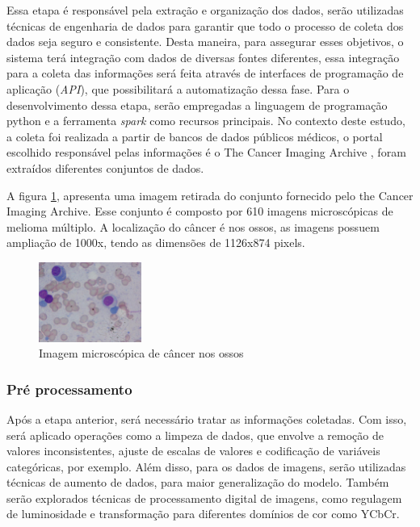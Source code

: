 Essa etapa é responsável pela extração e organização dos dados, serão utilizadas técnicas de engenharia de dados para garantir que todo o processo de coleta dos dados seja seguro e consistente. Desta maneira, para assegurar esses objetivos, o sistema terá integração com dados de diversas fontes diferentes, essa integração para a coleta das informações será feita através de interfaces de programação de aplicação (\textit{API}), que possibilitará a automatização dessa fase. Para o desenvolvimento dessa etapa, serão empregadas a linguagem de programação python e a ferramenta \textit{spark} como recursos principais. No contexto deste estudo, a coleta foi realizada a partir de bancos de dados públicos médicos, o portal escolhido responsável pelas informações é o The Cancer Imaging Archive \cite{cancerimaging}, foram extraídos diferentes conjuntos de dados. 

A figura \ref{fig:ex-dataset}, apresenta uma imagem retirada do conjunto fornecido pelo the Cancer Imaging Archive. Esse conjunto é composto por 610 imagens microscópicas de melioma múltiplo. A localização do câncer é nos ossos, as imagens possuem ampliação de 1000x, tendo as dimensões de 1126x874 pixels.


\begin{figure}[h] %
    \centering
    \includegraphics[width=0.3\textwidth]{images/datasetexample.jpg}
    \caption{Imagem microscópica de câncer nos ossos}
    \label{fig:ex-dataset}
\end{figure}

\subsubsection{Pré processamento}

Após a etapa anterior, será necessário tratar as informações coletadas. Com isso, será aplicado operações como a limpeza de dados, que envolve a remoção de valores inconsistentes, ajuste de escalas de valores e codificação de variáveis categóricas, por exemplo. Além disso, para os dados de imagens, serão utilizadas técnicas de aumento de dados, para maior generalização do modelo. Também serão explorados técnicas de processamento digital de imagens, como regulagem de luminosidade e transformação para diferentes domínios de cor como YCbCr.

